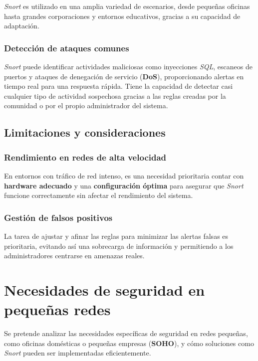 \documentclass[12pt,a4paper]{report}
\begin{document}
\textit{Snort} es utilizado en una amplia variedad de escenarios, desde pequeñas oficinas hasta grandes corporaciones y entornos educativos, gracias a su capacidad de adaptación.


\subsubsection{Detección de ataques comunes}

\textit{Snort} puede identificar actividades maliciosas como inyecciones \textit{SQL}, escaneos de puertos y ataques de denegación de servicio (\textbf{DoS}), proporcionando alertas en tiempo real para una respuesta rápida. Tiene la capacidad de detectar casi cualquier tipo de actividad sospechosa gracias a las reglas creadas por la comunidad o por el propio administrador del sistema.

\subsection{Limitaciones y consideraciones}

\subsubsection{Rendimiento en redes de alta velocidad}

En entornos con tráfico de red intenso, es una necesidad prioritaria contar con \textbf{hardware adecuado} y una \textbf{configuración óptima} para asegurar que \textit{Snort} funcione correctamente sin afectar el rendimiento del sistema.

\subsubsection{Gestión de falsos positivos}

La tarea de ajustar y afinar las reglas para minimizar las alertas falsas es prioritaria, evitando así una sobrecarga de información y permitiendo a los administradores centrarse en amenazas reales.

\section{Necesidades de seguridad en pequeñas redes}

Se pretende analizar las necesidades específicas de seguridad en redes pequeñas, como oficinas domésticas o pequeñas empresas (\textbf{SOHO}), y cómo soluciones como \textit{Snort} pueden ser implementadas eficientemente.
\end{document}
